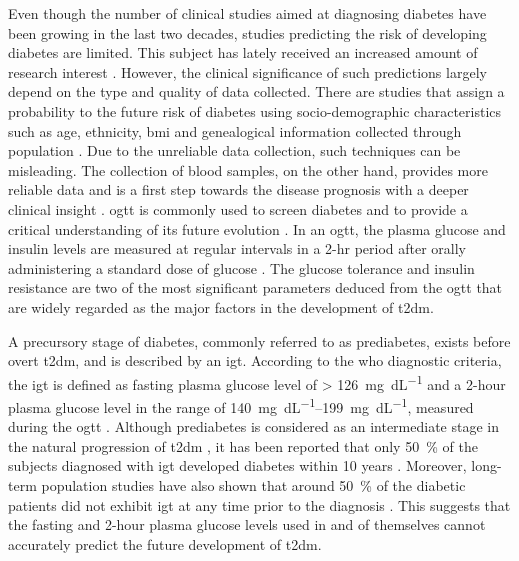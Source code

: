 \documentclass[journal,comsoc]{IEEEtran}
\renewcommand{\^}{\hat}  %
\begin{document}
Even though the number of clinical studies aimed at diagnosing diabetes have been growing in the last two decades, studies predicting the risk of developing diabetes are limited. This subject has lately received an increased amount of research interest \cite{noble2011risk}. However, the clinical significance of such predictions largely depend on the type and quality of data collected. There are studies that assign a probability to the future risk of diabetes using socio-demographic characteristics such as age, ethnicity, \ac{bmi} and genealogical information collected through population  \cite{Heikes1040, Glumer727}. Due to the unreliable data collection, such techniques can be misleading. The collection of blood samples, on the other hand, provides more reliable data and is a first step towards the disease prognosis with a deeper clinical insight \cite{HELIOVAARA1993181}. \ac{ogtt} is commonly used to screen diabetes \cite{expert-committee} and to provide a critical understanding of its future evolution \cite{stumvoll_use_2000}. In an \ac{ogtt}, the plasma glucose and insulin levels are measured at regular intervals in a 2-hr period after orally administering a standard dose of glucose \cite{stumvoll_use_2000}. The glucose tolerance and insulin resistance are two of the most significant parameters deduced from the \ac{ogtt} that are widely regarded as the major factors in the development of \ac{t2dm}.

A precursory stage of diabetes, commonly referred to as prediabetes, exists before overt \ac{t2dm}, and is described by an \ac{igt}. According to the \ac{who} diagnostic criteria, the \ac{igt} is defined as fasting plasma glucose level of \SI[round-mode = off,group-separator = {,}]{> 126}{\milli\gram\per\deci\liter} and a 2-hour plasma glucose level in the range of \SIrange[round-mode = off,group-separator = {,}]{140}{199}{\milli\gram\per\deci\liter}, measured during the \ac{ogtt} \cite{organization_definition_2006}. Although prediabetes is considered as an intermediate stage in the natural progression of \ac{t2dm} \cite{defronzo2011assessment}, it has been reported that only \SI{50}{\percent} of the subjects diagnosed with \ac{igt} developed diabetes within 10 years \cite{shaw_impaired_1999, writing_committee_impaired_2002}. Moreover, long-term population studies have also shown that around \SI{50}{\percent} of the diabetic patients did not exhibit \ac{igt} at any time prior to the diagnosis \cite{abdul-ghani_what_2007}. This suggests that the fasting and 2-hour plasma glucose levels used in and of themselves cannot accurately predict the future development of \ac{t2dm}.
\end{document}
